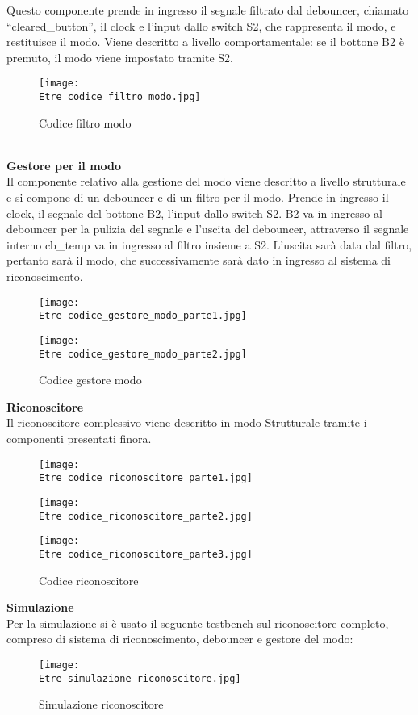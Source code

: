 \documentclass[12pt]{article}
\def \Etre {Allegati/Esercizio3/}
\begin{document}
Questo componente prende in ingresso il segnale filtrato dal debouncer, chiamato “cleared\_button”, il clock e l’input dallo switch S2, che rappresenta il modo, e restituisce il modo. Viene descritto a livello comportamentale:  se il bottone B2 è premuto, il modo viene impostato tramite S2.
\begin{figure}[ht]
    \centering
    \texttt{[image: \\Etre codice\_filtro\_modo.jpg]}
    \caption{Codice filtro modo}
\end{figure}
\\{\large \textbf{Gestore per il modo}}
\\Il componente relativo alla gestione del modo viene descritto a livello strutturale e si compone di un debouncer e di un filtro per il modo. Prende in ingresso il clock, il segnale del bottone B2, l’input dallo switch S2. B2 va in ingresso al debouncer per la pulizia del segnale e l’uscita del debouncer, attraverso il segnale interno cb\_temp va in ingresso al filtro insieme a S2. L’uscita sarà data dal filtro, pertanto sarà il modo, che successivamente sarà dato in ingresso al sistema di riconoscimento.
\begin{figure}[ht]
    \texttt{[image: \\Etre codice\_gestore\_modo\_parte1.jpg]}
\end{figure}
\begin{figure}[ht!]
    \centering
    \texttt{[image: \\Etre codice\_gestore\_modo\_parte2.jpg]}
    \caption{Codice gestore modo}
\end{figure}
\clearpage
{\large \textbf {Riconoscitore}}
\\Il riconoscitore complessivo viene descritto in modo Strutturale tramite i componenti presentati finora.
\begin{figure}[ht!]
    \centering
    \texttt{[image: \\Etre codice\_riconoscitore\_parte1.jpg]}
\end{figure}
\begin{figure}[ht!]
    \centering
    \texttt{[image: \\Etre codice\_riconoscitore\_parte2.jpg]}
\end{figure}
\clearpage
\begin{figure}[ht!]
    \centering
    \texttt{[image: \\Etre codice\_riconoscitore\_parte3.jpg]}
    \caption{Codice riconoscitore}
\end{figure}
{\large \textbf{Simulazione}}
\\Per la simulazione si è usato il seguente testbench sul riconoscitore completo, compreso di sistema di riconoscimento, debouncer e gestore del modo:
\begin{figure}[ht!]
    \centering
    \texttt{[image: \\Etre simulazione\_riconoscitore.jpg]}
    \caption{Simulazione riconoscitore}
\end{figure}
\newpage
\end{document}
